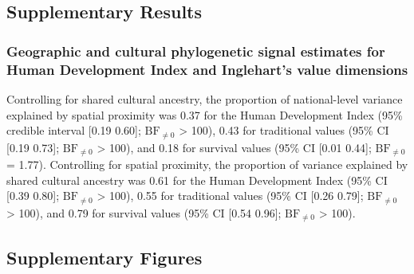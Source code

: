 \documentclass[english,man,floatsintext]{apa6}
\begin{document}
\newpage

\hypertarget{supplementary-results}{%
\subsection{Supplementary Results}\label{supplementary-results}}

\hypertarget{geographic-and-cultural-phylogenetic-signal-estimates-for-human-development-index-and-ingleharts-value-dimensions}{%
\subsubsection{Geographic and cultural phylogenetic signal estimates for Human Development Index and Inglehart's value dimensions}\label{geographic-and-cultural-phylogenetic-signal-estimates-for-human-development-index-and-ingleharts-value-dimensions}}

Controlling for shared cultural ancestry, the proportion of national-level variance explained by spatial proximity was 0.37 for the Human Development Index (95\% credible interval {[}0.19 0.60{]}; \(\text{BF}_{\neq0}\) \textgreater{} 100), 0.43 for traditional values (95\% CI {[}0.19 0.73{]}; \(\text{BF}_{\neq0}\) \textgreater{} 100), and 0.18 for survival values (95\% CI {[}0.01 0.44{]}; \(\text{BF}_{\neq0}\) = 1.77). Controlling for spatial proximity, the proportion of variance explained by shared cultural ancestry was 0.61 for the Human Development Index (95\% CI {[}0.39 0.80{]}; \(\text{BF}_{\neq0}\) \textgreater{} 100), 0.55 for traditional values (95\% CI {[}0.26 0.79{]}; \(\text{BF}_{\neq0}\) \textgreater{} 100), and 0.79 for survival values (95\% CI {[}0.54 0.96{]}; \(\text{BF}_{\neq0}\) \textgreater{} 100).

\newpage

\hypertarget{supplementary-figures}{%
\subsection{Supplementary Figures}\label{supplementary-figures}}
\end{document}
